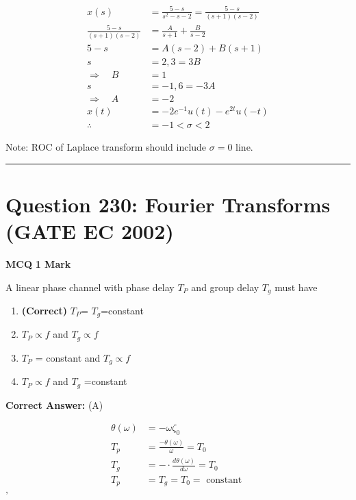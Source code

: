 \documentclass[11pt,a4paper]{article}
\begin{document}
\begin{tcolorbox}[solbox, title=Detailed Solution -- Question 229]
\[
\begin{aligned} x(s) &=\frac{5-s}{s^{2}-s-2}=\frac{5-s}{(s+1)(s-2)} \\ \frac{5-s}{(s+1)(s-2)} &=\frac{A}{s+1}+\frac{B}{s-2} \\ 5-s &=A(s-2)+B(s+1) \\ s &=2,3=3 B \\ \Rightarrow \quad B &=1 \\ s &=-1,6=-3 A \\ \Rightarrow \quad A &=-2 \\ x(t) &=-2 e^{-1} u(t)-e^{2 t} u(-t) \\ \therefore &=-1 < \sigma < 2 \end{aligned}
\]

 Note: ROC of Laplace transform should include $\sigma=0$ line.
\end{tcolorbox}

\vspace{1.5em}
\hrule
\vspace{1.5em}

\section*{Question 230: Fourier Transforms (GATE EC 2002)}
\noindent \textbf{\color{primary}MCQ} \hfill \textbf{\color{secondary}1 Mark}


\noindent A linear phase channel with phase delay $T_{P}$ and group delay $T_{g}$ must have


\begin{enumerate}[label=(\Alph*)]
    \item \textbf{(Correct)} $T_{P}$= $T_{g}$=constant
    \item $T_{P}\propto  f$ and $T_{g}\propto  f$
    \item $T_{P}$  = constant and $T_{g}\propto  f$
    \item $T_{P}\propto  f$  and $T_{g}$  =constant
\end{enumerate}

\noindent \textbf{Correct Answer:} (A)

\begin{tcolorbox}[solbox, title=Detailed Solution -- Question 230]
\[
\begin{aligned} \theta(\omega) &=-\omega \zeta_{0} \\ T_{p} &=\frac{-\theta(\omega)}{\omega}=T_{0} \\ T_{g} &=-\cdot \frac{d \theta(\omega)}{d \omega}=T_{0} \\ T_{p} &=T_{g}=T_{0}=\text { constant } \end{aligned}
\]
'
\end{tcolorbox}
\end{document}

